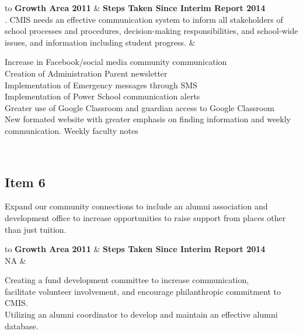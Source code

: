 \begin{longtabu} to \textwidth {|X|X|}
\hline
\textbf{Growth Area 2011} & \textbf{Steps Taken Since Interim Report 2014} \\
.  CMIS needs an effective communication system to inform all stakeholders of school processes and procedures, decision-making responsibilities, and school-wide issues, and information including student progress.
 &

\parbox[t]{2.8in}{
Increase in Facebook/social media community communication\\
Creation of Administration Parent newsletter\\
Implementation of Emergency messages through SMS\\
Implementation of Power School communication alerts\\
Greater use of Google Classroom and guardian access to Google Classroom \\
New formated website with greater emphasis on finding information and weekly communication. 
Weekly faculty notes  }\\
\hline

\end{longtabu}

\subsection{Item 6}

Expand our community connections to include an alumni association and development office to increase opportunities to raise support from places other than just tuition.

\begin{longtabu} to \textwidth {|X|X|}
\hline
\textbf{Growth Area 2011} & \textbf{Steps Taken Since Interim Report 2014} \\
\hline
NA
 &

\parbox[t]{2.8in}{
Creating a fund development committee to increase communication,\\
facilitate volunteer involvement, and encourage philanthropic commitment to CMIS.\\
Utilizing an alumni coordinator to develop and maintain an effective alumni database. }\\
\hline

\end{longtabu}

